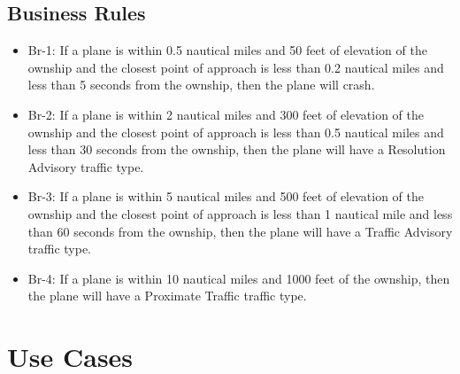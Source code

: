 \documentclass[12pt,oneside,letterpaper]{article}
\begin{document}
\subsection{Business Rules}
\begin{itemize}
\item Br-1: If a plane is within 0.5 nautical miles and 50 feet of elevation of the ownship and the closest point of approach is less than 0.2 nautical miles and less than 5 seconds from the ownship, then the plane will crash.
\item Br-2: If a plane is within 2 nautical miles and 300 feet of elevation of the ownship and the closest point of approach is less than 0.5 nautical miles and less than 30 seconds from the ownship, then the plane will have a Resolution Advisory traffic type.
\item Br-3: If a plane is within 5 nautical miles and 500 feet of elevation of the ownship and the closest point of approach is less than 1 nautical mile and less than 60 seconds from the ownship, then the plane will have a Traffic Advisory traffic type.
\item Br-4: If a plane is within 10 nautical miles and 1000 feet of the ownship, then the plane will have a Proximate Traffic traffic type.
\end{itemize}

\section{Use Cases}
\end{document}
